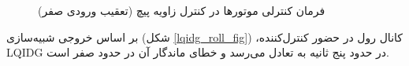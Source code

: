 \begin{figure}[H]
	\centering
	\caption{‫‪فرمان کنترلی موتورها در کنترل زاویه پیچ (تعقیب ورودی صفر)}
\end{figure}



بر اساس خروجی شبیه‌سازی (شکل
\ref{lqidg_roll_fig})
،کانال رول در حضور کنترل‌کننده LQIDG در حدود پنج ثانیه به تعادل می‌رسد و خطای ماندگار آن در حدود صفر است.